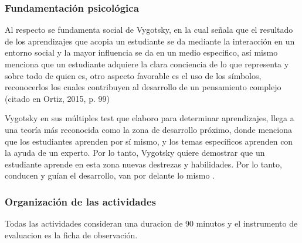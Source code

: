\documentclass[12pt,a4paper]{article}
\begin{document}
\subsubsection{Fundamentación psicológica}

Al respecto se fundamenta  social de Vygotsky, en la cual señala que el resultado de los aprendizajes que acopia un estudiante se da mediante la interacción en un entorno social y la mayor influencia se da en un medio especifico, así mismo menciona que un estudiante adquiere la clara conciencia de lo que representa y sobre todo de quien es, otro aspecto favorable es el uso de los símbolos, reconocerlos los cuales contribuyen al desarrollo de un pensamiento complejo (citado en Ortiz, 2015, p. 99)

Vygotsky en sus múltiples test que elaboro para determinar aprendizajes, llega a una teoría más reconocida como la zona de desarrollo próximo, donde menciona que los estudiantes aprenden por sí mismo, y los temas específicos aprenden con la ayuda de un experto. Por lo tanto, Vygotsky quiere demostrar que un estudiante aprende en esta zona nuevas destrezas y habilidades. Por lo tanto, conducen y guían el desarrollo, van por delante lo mismo .

\subsubsection{Organización de las actividades}
Todas las actividades consideran una duracion de 90 minutos y el instrumento de evaluacion es la ficha de observación.
\end{document}
